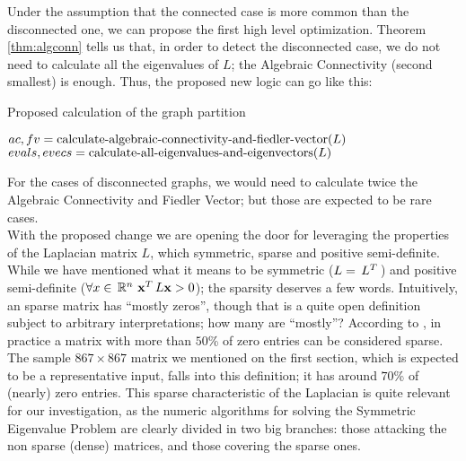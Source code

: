 Under the assumption that the connected case is more common than the
disconnected one, we can propose the first high level
optimization. Theorem \cref{thm:algconn} tells us that, in order to
detect the disconnected case, we do not need  to calculate all the
eigenvalues of $L$; the Algebraic Connectivity (second smallest) is
enough. Thus, the proposed new logic can go like this: \\

\begin{algorithm}
  \label{alg:optim-code}
  \caption{Proposed calculation of the graph partition}
%
  \DontPrintSemicolon
%
%
%
    $ac, fv = \operatorname{calculate-algebraic-connectivity-and-fiedler-vector}(L)$ \;
%    
    {
       $evals, evecs = \operatorname{calculate-all-eigenvalues-and-eigenvectors}(L)$ \;      
       \;
    }
    \Else
    {
       \;
    }
\end{algorithm}
\hfill

For the cases of disconnected graphs, we would need to
calculate twice the Algebraic Connectivity and Fiedler Vector; but
those are expected to be rare cases. \\

With the proposed change we are opening the door for leveraging the
properties of the Laplacian matrix $L$, which symmetric, sparse and
positive semi-definite. While we have mentioned what it means to be
symmetric ($L = \,{L}^{T}\,$) and positive semi-definite ($\forall x \in
\,\mathbb{R}^{n}\, \,{\mathbf{x}}^{T}\,L\mathbf{x} > 0$); the sparsity deserves a few
words. Intuitively, an sparse matrix has ``mostly zeros'', though that
is a quite open definition subject to arbitrary interpretations; how many
are ``mostly''? According to \cite{richard12}, in practice a matrix
with more than $50$\% of zero entries can be considered sparse. The
sample $867 \times 867$ matrix we mentioned on the first section,
which is expected to be a representative input, falls into this
definition; it has around $70$\% of (nearly) zero entries. This
sparse characteristic of the Laplacian is quite relevant for our
investigation, as the numeric algorithms for solving the Symmetric
Eigenvalue Problem are clearly divided in two big branches: those
attacking the non sparse (dense) matrices, and those covering the
sparse ones. \\


